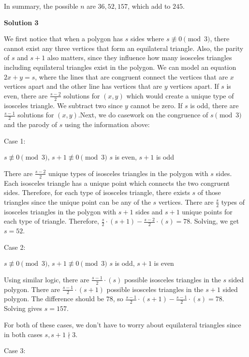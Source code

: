 \begin{enumerate}
 In summary, the possible $n$ are $36, 52, 157$, which add to $\boxed{245}$.

 



\textbf{Solution 3}

We first notice that when a polygon has $s$ sides where $s\not\equiv 0\pmod{3}$, there cannot exist any three vertices that form an equilateral triangle. Also, the parity of $s$ and $s+1$ also matters, since they influence how many isosceles triangles including equilateral triangles exist in the polygon. We can model an equation $2x+y=s$, where the lines that are congruent connect the vertices that are $x$ vertices apart and the other line has vertices that are $y$ vertices apart. If $s$ is even, there are $\frac{s-2}{2}$ solutions for $(x,y)$ which would create a unique type of isosceles triangle. We subtract two since $y$ cannot be zero. If $s$ is odd, there are $\frac{s-1}{2}$ solutions for $(x,y)$.Next, we do casework on the congruence of $s\pmod{3}$ and the parody of $s$ using the information above:

 Case 1:

 $s\not\equiv 0\pmod{3}$, $s+1\not\equiv 0\pmod{3}$
$s$ is even, $s+1$ is odd

 There are $\frac{s-2}{2}$ unique types of isosceles triangles in the polygon with $s$ sides. Each isosceles triangle has a unique point which connects the two congruent sides. Therefore, for each type of isosceles triangle, there exists $s$ of those triangles since the unique point can be any of the $s$ vertices. There are $\frac{s}{2}$ types of isosceles triangles in the polygon with $s+1$ sides and $s+1$ unique points for each type of triangle. Therefore, $\frac{s}{2}\cdot{(s+1)}-\frac{s-2}{2}\cdot{(s)}=78$. Solving, we get $s=52$.

 Case 2:

 $s\not\equiv 0\pmod{3}$, $s+1\not\equiv 0\pmod{3}$
$s$ is odd, $s+1$ is even

 Using similar logic, there are $\frac{s-1}{2}\cdot{(s)}$ possible isosceles triangles in the $s$ sided polygon. There are $\frac{s-1}{2}\cdot{(s+1)}$ possible isosceles triangles in the $s+1$ sided polygon. The difference should be $78$, so $\frac{s-1}{2}\cdot{(s+1)}-\frac{s-1}{2}\cdot{(s)}=78$. Solving gives $s=157$.

 For both of these cases, we don't have to worry about equilateral triangles since in both cases $s,s+1\nmid3$.

 Case 3:


\end{enumerate}
